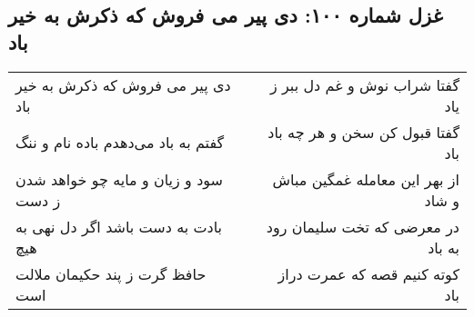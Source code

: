 \begin{center}
\section*{غزل شماره ۱۰۰: دی پیر می فروش که ذکرش به خیر باد}
\label{sec:sh100}
\begin{longtable}{l p{0.5cm} r}
دی پیر می فروش که ذکرش به خیر باد
&&
گفتا شراب نوش و غم دل ببر ز یاد
\\
گفتم به باد می‌دهدم باده نام و ننگ
&&
گفتا قبول کن سخن و هر چه باد باد
\\
سود و زیان و مایه چو خواهد شدن ز دست
&&
از بهر این معامله غمگین مباش و شاد
\\
بادت به دست باشد اگر دل نهی به هیچ
&&
در معرضی که تخت سلیمان رود به باد
\\
حافظ گرت ز پند حکیمان ملالت است
&&
کوته کنیم قصه که عمرت دراز باد
\\
\end{longtable}
\end{center}
